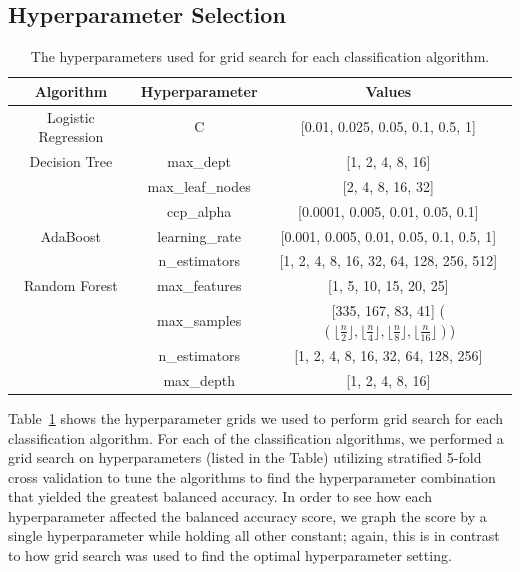 \documentclass[12pt]{article}
\newtheorem{Proof of Lemma}{Proof of Lemma}
\begin{document}
\subsection{Hyperparameter Selection}

\begin{table}[h!]
  \centering
  \caption{The hyperparameters used for grid search for each classification algorithm.}
  \begin{tabular}{|c|c|c|}
    \hline
    \textbf{Algorithm} & \textbf{Hyperparameter} & \textbf{Values} \\ \hline
    Logistic Regression & C & [0.01, 0.025, 0.05, 0.1, 0.5, 1] \\ \hline
    Decision Tree & max\_dept &  [1, 2, 4, 8, 16] \\
    & max\_leaf\_nodes & [2, 4, 8, 16, 32] \\
    & ccp\_alpha & [0.0001, 0.005, 0.01, 0.05, 0.1] \\ \hline
    AdaBoost & learning\_rate & [0.001, 0.005, 0.01, 0.05, 0.1, 0.5, 1] \\
    & n\_estimators & [1, 2, 4, 8, 16, 32, 64, 128, 256, 512] \\ \hline 
    Random Forest & max\_features & [1, 5, 10, 15, 20, 25] \\
    & max\_samples & [335, 167, 83, 41] ($(\lfloor\frac{n}{2}\rfloor, \lfloor\frac{n}{4}\rfloor, \lfloor\frac{n}{8}\rfloor,\lfloor\frac{n}{16}\rfloor)$) \\
    & n\_estimators & [1, 2, 4, 8, 16, 32, 64, 128, 256] \\
    & max\_depth & [1, 2, 4, 8, 16] \\ \hline
  \end{tabular}
  \label{tab:hyperparams}
  \end{table}

Table~\ref{tab:hyperparams} shows the hyperparameter grids we used to perform grid search
for each classification algorithm. For each of the classification algorithms, we performed a grid search on hyperparameters (listed in the Table) utilizing 
stratified 5-fold cross validation to tune the algorithms to find the hyperparameter combination that yielded the greatest balanced accuracy. In order to see how 
each hyperparameter affected the balanced accuracy score, we graph the score by a single hyperparameter while holding all other constant; again, 
this is in contrast to how grid search was used to find the optimal hyperparameter setting. 
\end{document}
